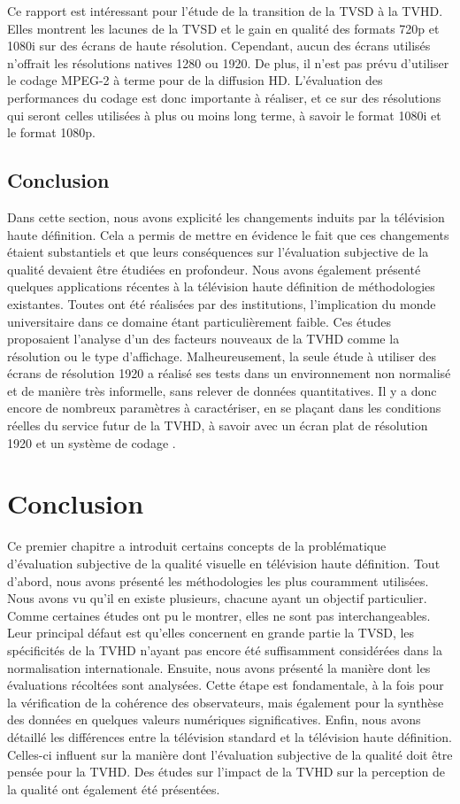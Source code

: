 Ce rapport est intéressant pour l'étude de la transition de la TVSD à la TVHD. Elles montrent les lacunes de la TVSD et le gain en qualité des formats 720p et 1080i sur des écrans de haute résolution. Cependant, aucun des écrans utilisés n'offrait les résolutions natives 1280 ou 1920. De plus, il n'est pas prévu d'utiliser le codage MPEG-2 à terme pour de la diffusion HD. L'évaluation des performances du codage \avc{} est donc importante à réaliser, et ce sur des résolutions qui seront celles utilisées à plus ou moins long terme, à savoir le format 1080i et le format 1080p.


\subsection{Conclusion}
Dans cette section, nous avons explicité les changements induits par la télévision haute définition. Cela a permis de mettre en évidence le fait que ces changements étaient substantiels et que leurs conséquences sur l'évaluation subjective de la qualité devaient être étudiées en profondeur. Nous avons également présenté quelques applications récentes à la télévision haute définition de méthodologies existantes. Toutes ont été réalisées par des institutions, l'implication du monde universitaire dans ce domaine étant particulièrement faible. Ces études proposaient l'analyse d'un des facteurs nouveaux de la TVHD comme la résolution ou le type d'affichage. Malheureusement, la seule étude à utiliser des écrans de résolution 1920 a réalisé ses tests dans un environnement non normalisé et de manière très informelle, sans relever de données quantitatives. Il y a donc encore de nombreux paramètres à caractériser, en se plaçant dans les conditions réelles du service futur de la TVHD, à savoir avec un écran plat de résolution 1920 et un système de codage \avc.


\section{Conclusion}
Ce premier chapitre a introduit certains concepts de la problématique d'évaluation subjective de la qualité visuelle en télévision haute définition. Tout d'abord, nous avons présenté les méthodologies les plus couramment utilisées. Nous avons vu qu'il en existe plusieurs, chacune ayant un objectif particulier. Comme certaines études ont pu le montrer, elles ne sont pas interchangeables. Leur principal défaut est qu'elles concernent en grande partie la TVSD, les spécificités de la TVHD n'ayant pas encore été suffisamment considérées dans la normalisation internationale. Ensuite, nous avons présenté la manière dont les évaluations récoltées sont analysées. Cette étape est fondamentale, à la fois pour la vérification de la cohérence des observateurs, mais également pour la synthèse des données en quelques valeurs numériques significatives. Enfin, nous avons détaillé les différences entre la télévision standard et la télévision haute définition. Celles-ci influent sur la manière dont l'évaluation subjective de la qualité doit être pensée pour la TVHD. Des études sur l'impact de la TVHD sur la perception de la qualité ont également été présentées.

